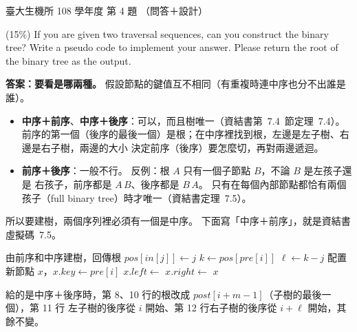 \begin{pastexam}[label={px:ntu-108-bime-ds-04}]{臺大生機所 108 學年度 第 4 題}
（問答＋設計）

(15\%) If you are given two traversal sequences, can you construct the binary tree? Write a pseudo
code to implement your answer. Please return the root of the binary tree as the output.
\end{pastexam}

\begin{pastsoln}
\textbf{答案：要看是哪兩種。} 假設節點的鍵值互不相同（有重複時連中序也分不出誰是誰）。
\begin{itemize}
\item \textbf{中序＋前序}、\textbf{中序＋後序}：可以，而且樹唯一（資結書第~7.4~節定理~7.4）。
前序的第一個（後序的最後一個）是根；在中序裡找到根，左邊是左子樹、右邊是右子樹，兩邊的大小
決定前序（後序）要怎麼切，再對兩邊遞迴。
\item \textbf{前序＋後序}：一般不行。 反例：根 $A$ 只有一個子節點 $B$，不論 $B$ 是左孩子還是
右孩子，前序都是 $A\,B$、後序都是 $B\,A$。 只有在每個內部節點都恰有兩個孩子（full binary
tree）時才唯一（資結書定理~7.5）。
\end{itemize}
所以要建樹，兩個序列裡必須有一個是中序。 下面寫「中序＋前序」，就是資結書虛擬碼~7.5。

\begin{pseudo}{由前序和中序建樹，回傳根}
        \State $\mathit{pos}[\mathit{in}[j]] \gets j$ 
    \EndFor
    \State \Return {}
\EndFunction
{} 
        \State \Return \NIL
    \EndIf
    \State $k \gets \mathit{pos}[\mathit{pre}[i]]$ 
    \State $\ell \gets k - j$ 
    \State 配置新節點 $x$，$x.\mathit{key} \gets \mathit{pre}[i]$
    \State $x.\mathit{left} \gets$ 
    \State $x.\mathit{right} \gets$ 
    \State \Return $x$
\EndFunction
\end{pseudo}
給的是中序＋後序時，第 8、10 行的根改成 $\mathit{post}[i + m - 1]$（子樹的最後一個），第 11 行
左子樹的後序從 $i$ 開始、第 12 行右子樹的後序從 $i + \ell$ 開始，其餘不變。


\end{pastsoln}
